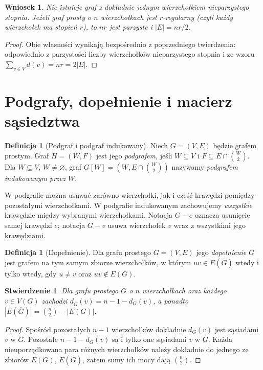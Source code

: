 \documentclass[11pt,a4paper]{report}
\numberwithin{equation}{section}
\theoremstyle{plain}
\newtheorem{stwierdzenie}[twierdzenie]{Stwierdzenie}
\newtheorem{wniosek}[twierdzenie]{Wniosek}
\theoremstyle{definition}
\newtheorem{definicja}[twierdzenie]{Definicja}
\theoremstyle{remark}
\begin{document}
\begin{wniosek}
Nie istnieje graf z dokładnie jednym wierzchołkiem
nieparzystego stopnia. Jeżeli graf prosty o $n$
wierzchołkach jest $r$-regularny (czyli każdy wierzchołek
ma stopień $r$), to $nr$ jest parzyste i
$|E|=nr/2$.
\end{wniosek}

\begin{proof}
Obie własności wynikają bezpośrednio z poprzedniego
twierdzenia: odpowiednio z parzystości liczby
wierzchołków nieparzystego stopnia i ze wzoru
$\sum_{v\in V}d(v)=nr=2|E|$.
\end{proof}

\section{Podgrafy, dopełnienie i macierz sąsiedztwa}
\label{sec:tg-podgrafy}

\begin{definicja}[Podgraf i podgraf indukowany]
Niech $G=(V,E)$ będzie grafem prostym. Graf
$H=(W,F)$ jest jego \emph{podgrafem}, jeśli
$W\subseteq V$ i $F\subseteq E\cap\binom W2$.
Dla $W\subseteq V$, $W\ne\varnothing$, graf
$G[W]=(W,E\cap\binom W2)$ nazywamy
\emph{podgrafem indukowanym przez $W$}.
\end{definicja}

W podgrafie można usuwać zarówno wierzchołki, jak i część
krawędzi pomiędzy pozostałymi wierzchołkami. W podgrafie
indukowanym zachowujemy \emph{wszystkie} krawędzie między
wybranymi wierzchołkami. Notacja $G-e$ oznacza usunięcie
samej krawędzi $e$; notacja $G-v$ usuwa wierzchołek $v$
wraz z wszystkimi jego krawędziami.

\begin{definicja}[Dopełnienie]
Dla grafu prostego $G=(V,E)$ jego
\emph{dopełnienie} $\overline G$ jest grafem na
tym samym zbiorze wierzchołków, w którym
$uv\in E(\overline G)$ wtedy i tylko wtedy,
gdy $u\ne v$ oraz $uv\notin E(G)$.
\end{definicja}

\begin{stwierdzenie}
Dla grafu prostego $G$ o $n$ wierzchołkach oraz
każdego $v\in V(G)$ zachodzi
$d_{\overline G}(v)=n-1-d_G(v)$, a ponadto
$|E(\overline G)|=\binom n2-|E(G)|$.
\end{stwierdzenie}

\begin{proof}
Spośród pozostałych $n-1$ wierzchołków dokładnie
$d_G(v)$ jest sąsiadami $v$ w $G$. Pozostałe
$n-1-d_G(v)$ są i tylko one sąsiadami $v$ w
$\overline G$. Każda nieuporządkowana para różnych
wierzchołków należy dokładnie do jednego ze zbiorów
$E(G)$, $E(\overline G)$, zatem sumy ich mocy dają
$\binom n2$.
\end{proof}
\end{document}
